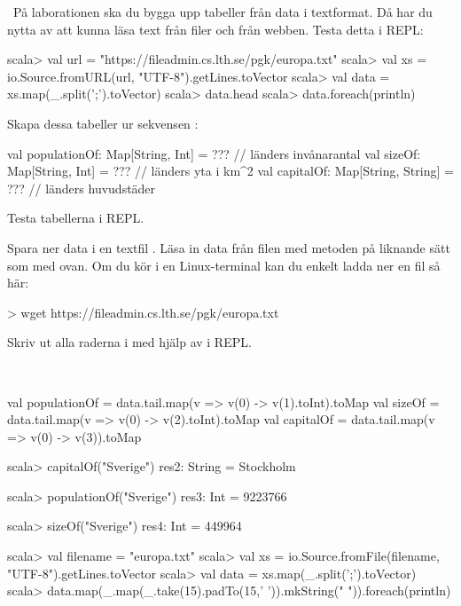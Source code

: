 \QUESTEND





\QUESTBEGIN

\Task \what~På laborationen ska du bygga upp tabeller från data i textformat. Då har du nytta av att kunna läsa text från filer och från webben. Testa detta i REPL:
\begin{REPL}
scala> val url = "https://fileadmin.cs.lth.se/pgk/europa.txt"
scala> val xs = io.Source.fromURL(url, "UTF-8").getLines.toVector
scala> val data = xs.map(_.split(';').toVector)
scala> data.head
scala> data.foreach(println)
\end{REPL}

\Subtask Skapa dessa tabeller ur sekvensen :
\begin{Code}
val populationOf: Map[String, Int]    = ???  // länders invånarantal
val sizeOf:       Map[String, Int]    = ???  // länders yta i km^2
val capitalOf:    Map[String, String] = ???  // länders huvudstäder
\end{Code}
Testa tabellerna i REPL.

\Subtask Spara ner data i en textfil . Läsa in data från filen med metoden  på liknande sätt som med   ovan. Om du kör i en Linux-terminal kan du enkelt ladda ner en fil så här:
\begin{REPLnonum}
> wget https://fileadmin.cs.lth.se/pgk/europa.txt
\end{REPLnonum}
Skriv ut alla raderna i  med hjälp av  i REPL.

\SOLUTION

\TaskSolved \what~

\SubtaskSolved
\begin{CodeSmall}
val populationOf = data.tail.map(v => v(0) -> v(1).toInt).toMap
val sizeOf       = data.tail.map(v => v(0) -> v(2).toInt).toMap
val capitalOf    = data.tail.map(v => v(0) -> v(3)).toMap
\end{CodeSmall}

\begin{REPL}
scala> capitalOf("Sverige")
res2: String = Stockholm

scala> populationOf("Sverige")
res3: Int = 9223766

scala> sizeOf("Sverige")
res4: Int = 449964
\end{REPL}

\begin{REPL}
scala> val filename = "europa.txt"
scala> val xs = io.Source.fromFile(filename, "UTF-8").getLines.toVector
scala> val data = xs.map(_.split(';').toVector)
scala> data.map(_.map(_.take(15).padTo(15,' ')).mkString(" ")).foreach(println)
\end{REPL}
\QUESTEND






